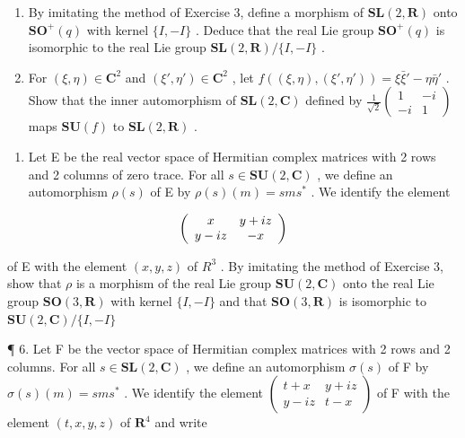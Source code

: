\begin{enumerate}
\def\labelenumi{(\alph{enumi})}
\setcounter{enumi}{1}
\item
  By imitating the method of Exercise 3, define a morphism of \(\mathbf{SL}(2,\mathbf{R})\) onto \(\mathbf{SO}^{+}(q)\) with kernel \(\{I, - I\}\) . Deduce that the real Lie group \(\mathbf{SO}^{+}(q)\) is isomorphic to the real Lie group \(\mathbf{SL}(2,\mathbf{R}) / \{I, - I\}\) .
\item
  For \((\xi, \eta) \in \mathbf{C}^2\) and \((\xi', \eta') \in \mathbf{C}^2\) , let \(f((\xi, \eta), (\xi', \eta')) = \xi \bar{\xi}' - \eta \bar{\eta}'\) . Show that the inner automorphism of \(\mathbf{SL}(2, \mathbf{C})\) defined by \(\frac{1}{\sqrt{2}} \begin{pmatrix} 1 & -i \\ -i & 1 \end{pmatrix}\) maps \(\mathbf{SU}(f)\) to \(\mathbf{SL}(2, \mathbf{R})\) .
\end{enumerate}

\begin{enumerate}
\def\labelenumi{\arabic{enumi}.}
\setcounter{enumi}{4}
\tightlist
\item
  Let E be the real vector space of Hermitian complex matrices with 2 rows and 2 columns of zero trace. For all \(s \in \mathbf{SU}(2, \mathbf{C})\) , we define an automorphism \(\rho(s)\) of E by \(\rho(s)(m) = sms^*\) . We identify the element
\end{enumerate}

\[
\left( \begin{array}{c c} x & y + i z \\ y - i z & - x \end{array} \right)
\]

of E with the element \((x,y,z)\) of \(R^{3}\) . By imitating the method of Exercise 3, show that \(\rho\) is a morphism of the real Lie group \(\mathbf{SU}(2,\mathbf{C})\) onto the real Lie group \(\mathbf{SO}(3,\mathbf{R})\) with kernel \(\{I,-I\}\) and that \(\mathbf{SO}(3,\mathbf{R})\) is isomorphic to \(\mathbf{SU}(2,\mathbf{C})/\{I,-I\}\)

¶ 6. Let F be the vector space of Hermitian complex matrices with 2 rows and 2 columns. For all \(s \in \mathbf{SL}(2, \mathbf{C})\) , we define an automorphism \(\sigma(s)\) of F by \(\sigma(s)(m) = sms^*\) . We identify the element \(\begin{pmatrix} t + x & y + iz \\ y - iz & t - x \end{pmatrix}\) of F with the element \((t, x, y, z)\) of \(\mathbf{R}^4\) and write


